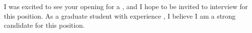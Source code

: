 \begin{cvletter}
  I was excited to see your opening for a \clposition, and I hope
	to be invited to interview for this position. As a graduate student
  with experience \clintroexp, I believe I am a strong candidate for
  this position.
\end{cvletter}
